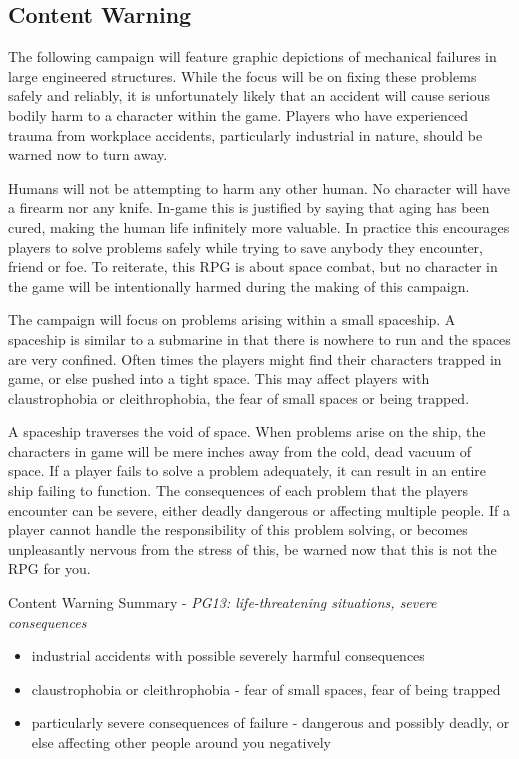 \documentclass[a4paper]{article}
\begin{document}
\subsection{Content Warning}

The following campaign will feature graphic depictions of mechanical failures in large engineered structures. While the focus will be on fixing these problems safely and reliably, it is unfortunately likely that an accident will cause serious bodily harm to a character within the game. Players who have experienced trauma from workplace accidents, particularly industrial in nature, should be warned now to turn away. 

Humans will not be attempting to harm any other human. No character will have a firearm nor any knife. In-game this is justified by saying that aging has been cured, making the human life infinitely more valuable. In practice this encourages players to solve problems safely while trying to save anybody they encounter, friend or foe. To reiterate, this RPG is about space combat, but no character in the game will be intentionally harmed during the making of this campaign.

The campaign will focus on problems arising within a small spaceship. A spaceship is similar to a submarine in that there is nowhere to run and the spaces are very confined. Often times the players might find their characters trapped in game, or else pushed into a tight space. This may affect players with claustrophobia or cleithrophobia, the fear of small spaces or being trapped.

A spaceship traverses the void of space. When problems arise on the ship, the characters in game will be mere inches away from the cold, dead vacuum of space. If a player fails to solve a problem adequately, it can result in an entire ship failing to function. The consequences of each problem that the players encounter can be severe, either deadly dangerous or affecting multiple people. If a player cannot handle the responsibility of this problem solving, or becomes unpleasantly nervous from the stress of this, be warned now that this is not the RPG for you.

\vspace{0.5cm} \hspace{-18pt} Content Warning Summary - \textit{PG13: life-threatening situations, severe consequences}
\begin{itemize}
\item industrial accidents with possible severely harmful consequences
\item claustrophobia or cleithrophobia - fear of small spaces, fear of being trapped
\item particularly severe consequences of failure - dangerous and possibly deadly, or else affecting other people around you negatively
\end{itemize}
\end{document}
